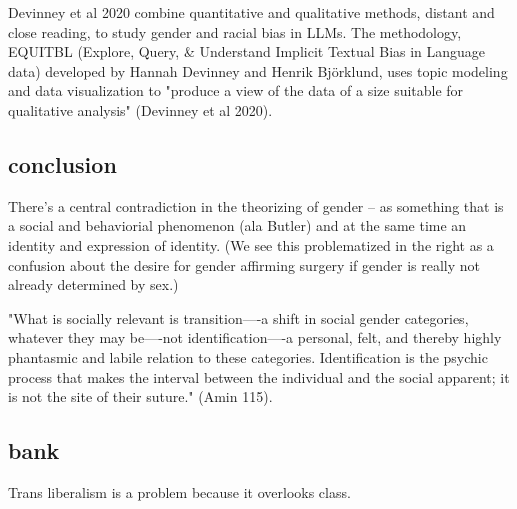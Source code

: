 \documentclass[11pt]{article}
\begin{document}
Devinney et al 2020 combine quantitative and qualitative methods,
distant and close reading, to study gender and racial bias in LLMs.
The methodology, EQUITBL (Explore, Query, \& Understand Implicit
Textual Bias in Language data) developed by Hannah Devinney and Henrik
Björklund, uses topic modeling and data visualization to "produce a
view of the data of a size suitable for qualitative analysis"
(Devinney et al 2020).

\subsection{conclusion}
\label{sec:orgc6fa64d}
There's a central contradiction in the theorizing of gender -- as
something that is a social and behaviorial phenomenon (ala Butler) and
at the same time an identity and expression of identity. (We see this
problematized in the right as a confusion about the desire for gender
affirming surgery if gender is really not already determined by sex.)

"What is socially relevant is transition—-a shift in social gender
categories, whatever they may be—-not identification—-a personal,
felt, and thereby highly phantasmic and labile relation to these
categories. Identification is the psychic process that makes the
interval between the individual and the social apparent; it is not the
site of their suture." (Amin 115).


\subsection{bank}
\label{sec:orgc3c135a}

Trans liberalism is a problem because it overlooks class. 
\end{document}
